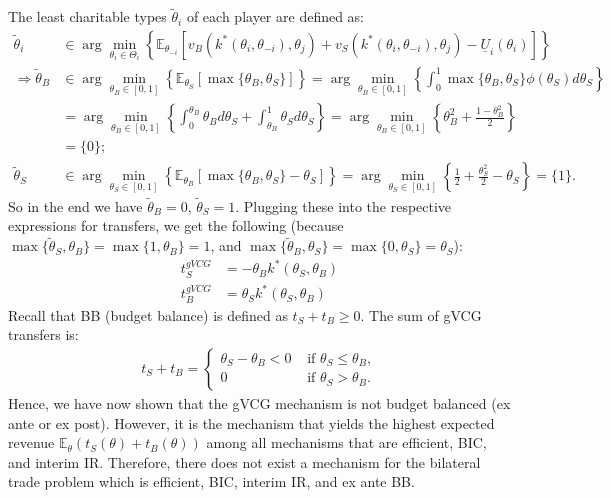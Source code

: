 \documentclass[a4paper]{article}
\begin{document}
The least charitable types $\tilde{\theta}_i$ of each player are defined as:
\begin{align*}
	\tilde{\theta}_i &\in \arg \min_{\theta_i \in \Theta_i} \left\{ \mathbb{E}_{\theta_{-i}} \left[ v_B (k^*(\theta_i,\theta_{-i}),\theta_j) + v_S (k^*(\theta_i,\theta_{-i}),\theta_j) - \underline{U}_i (\theta_i) \right] \right\}
	\\
	\Rightarrow \tilde{\theta}_B &\in \arg \min_{\theta_B \in [0,1]} \left\{ \mathbb{E}_{\theta_S} \left[ \max\{\theta_B,\theta_S\} \right] \right\} 
	= \arg \min_{\theta_B \in [0,1]} \left\{ \int_0^1 \max\{\theta_B,\theta_S\} \phi(\theta_S) d\theta_S \right\}
	\\
	&= \arg \min_{\theta_B \in [0,1]} \left\{ \int_0^{\theta_B} \theta_B d\theta_S + \int_{\theta_B}^1 \theta_S d\theta_S \right\}
	= \arg \min_{\theta_B \in [0,1]} \left\{ \theta_B^2 +  \frac{1-\theta_B^2}{2} \right\}	
	\\
	&= \{ 0 \};
	\\
	\tilde{\theta}_S &\in \arg \min_{\theta_S \in [0,1]} \left\{ \mathbb{E}_{\theta_B} \left[ \max\{\theta_B,\theta_S\} - \theta_S \right] \right\} = \arg \min_{\theta_S \in [0,1]} \left\{ \frac{1}{2} + \frac{\theta_S^2}{2} - \theta_S \right\} = \{1\}.
\end{align*}
So in the end we have $\tilde{\theta}_B = 0$, $\tilde{\theta}_S = 1$. Plugging these into the respective expressions for transfers, we get the following (because $\max\{\tilde{\theta}_S,\theta_B\} = \max\{1,\theta_B\} = 1$, and $\max\{\tilde{\theta}_B,\theta_S\} = \max\{0,\theta_S\} = \theta_S$):
\begin{align*}
	t_S^{gVCG} &= - \theta_B k^*(\theta_S,\theta_B)
	\\
	t_B^{gVCG} &= \theta_S k^*(\theta_S,\theta_B)
\end{align*}
Recall that BB (budget balance) is defined as $t_S+t_B\geq0$. The sum of gVCG transfers is:
\begin{align*}
	t_S+t_B= \begin{cases}
		\theta_S - \theta_B <0 & \text{ if } \theta_S \leq \theta_B, 
		\\ 
		0 & \text{ if } \theta_S > \theta_B.
	\end{cases}
\end{align*}
Hence, we have now shown that the gVCG mechanism is not budget balanced (ex ante or ex post). However, it is the mechanism that yields the highest expected revenue $\mathbb{E}_\theta \left(t_S(\theta) + t_B(\theta)\right)$ among all mechanisms that are efficient, BIC, and interim IR. Therefore, there does not exist a mechanism for the bilateral trade problem which is efficient, BIC, interim IR, and ex ante BB.
\end{document}
